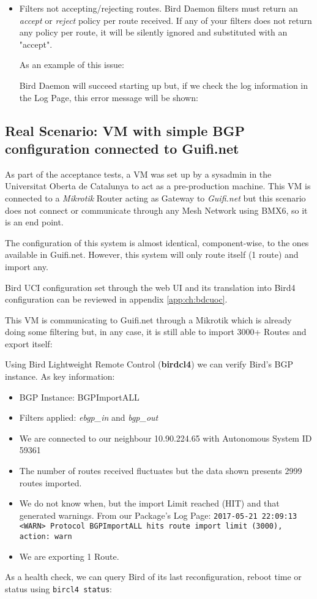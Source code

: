 \begin{itemize}
\item Filters not accepting/rejecting routes.
Bird Daemon filters must return an \textit{accept} or \textit{reject} policy per route received. If any of your filters does not return any policy per route, it will be silently ignored and substituted with an "accept".

As an example of this issue:


Bird Daemon will succeed starting up but, if we check the log information in the Log Page, this error message will be shown:


\end{itemize}

\subsection{Real Scenario: VM with simple BGP configuration connected to Guifi.net}
As part of the acceptance tests, a VM was set up by a sysadmin in the Universitat Oberta de Catalunya to act as a pre-production machine. This VM is connected to a \textit{Mikrotik} Router acting as Gateway to \textit{Guifi.net} but this scenario does not connect or communicate through any Mesh Network using BMX6, so it is an end point.

The configuration of this system is almost identical, component-wise, to the ones available in Guifi.net. However, this system will only route itself (1 route) and import any.

Bird UCI configuration set through the web UI and its translation into Bird4 configuration can be reviewed in appendix \ref{app:ch:bdcuoc}.

This VM is communicating to Guifi.net through a Mikrotik which is already doing some filtering but, in any case, it is still able to import 3000+ Routes and export itself:



Using Bird Lightweight Remote Control (\textbf{birdcl4}) we can verify Bird's BGP instance. As key information:

\begin{itemize}
    \item BGP Instance: BGPImportALL
    \item Filters applied: \textit{ebgp\_in} and \textit{bgp\_out}
    \item We are connected to our neighbour 10.90.224.65 with Autonomous System ID 59361
    \item  The number of routes received fluctuates but the data shown presents 2999 routes imported.
    \item We do not know when, but the import Limit reached (HIT) and that generated warnings.
    From our Package's Log Page:
    \texttt{2017-05-21 22:09:13 <WARN> Protocol BGPImportALL hits route import limit (3000), action: warn}
    \item We are exporting 1 Route.
\end{itemize}

As a health check, we can query Bird of its last reconfiguration, reboot time or status using \texttt{bircl4 status}:


